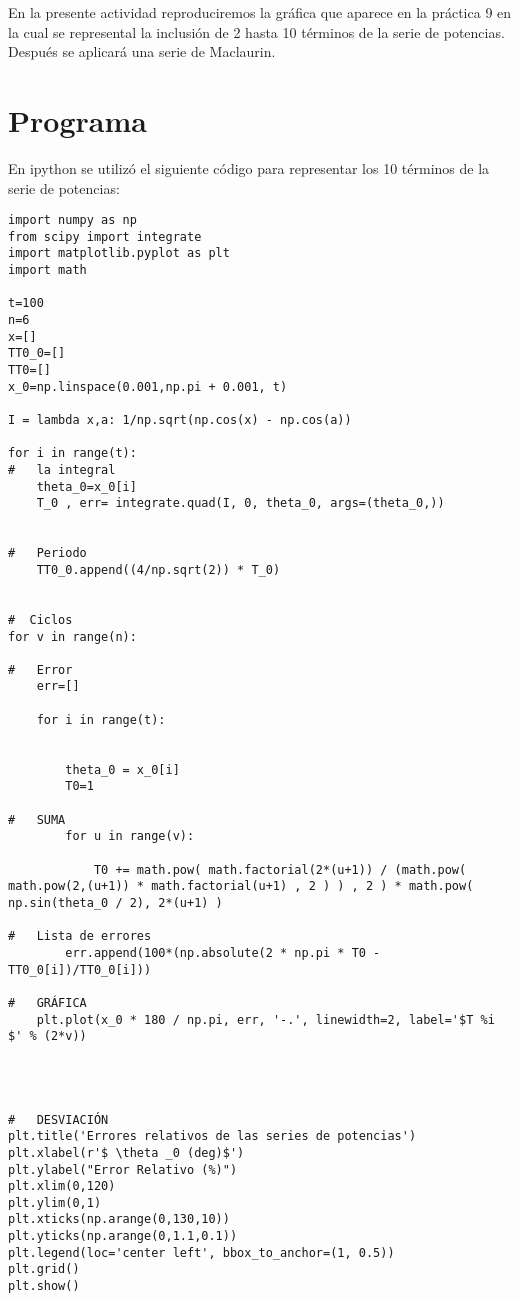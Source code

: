 \documentclass[a4 paper]{article}
\numberwithin{equation}{section}
\newcommand{\0}{\mathbf{0}}
\begin{document}
En la presente actividad reproduciremos la gr\'afica que aparece en la pr\'actica 9 en la cual se represental la inclusi\'on de 2 hasta 10 t\'erminos de la serie de potencias.\\

Despu\'es se aplicar\'a una serie de Maclaurin.

\section{Programa}

En ipython se utilizó el siguiente c\'odigo para representar los 10 t\'erminos de la serie de potencias:

\begin{verbatim}
import numpy as np
from scipy import integrate
import matplotlib.pyplot as plt
import math

t=100
n=6
x=[]
TT0_0=[]
TT0=[]
x_0=np.linspace(0.001,np.pi + 0.001, t)

I = lambda x,a: 1/np.sqrt(np.cos(x) - np.cos(a))

for i in range(t):
#   la integral
    theta_0=x_0[i]
    T_0 , err= integrate.quad(I, 0, theta_0, args=(theta_0,))
    
    
#   Periodo
    TT0_0.append((4/np.sqrt(2)) * T_0)

    
#  Ciclos   
for v in range(n):
    
#   Error   
    err=[]
        
    for i in range(t):
    
    
        theta_0 = x_0[i]
        T0=1

#   SUMA     
        for u in range(v):
            
            T0 += math.pow( math.factorial(2*(u+1)) / (math.pow( math.pow(2,(u+1)) * math.factorial(u+1) , 2 ) ) , 2 ) * math.pow( np.sin(theta_0 / 2), 2*(u+1) )   
            
#   Lista de errores          
        err.append(100*(np.absolute(2 * np.pi * T0 - TT0_0[i])/TT0_0[i]))
   
#   GRÁFICA   
    plt.plot(x_0 * 180 / np.pi, err, '-.', linewidth=2, label='$T %i $' % (2*v))
    
    

   
#   DESVIACIÓN
plt.title('Errores relativos de las series de potencias')
plt.xlabel(r'$ \theta _0 (deg)$')
plt.ylabel("Error Relativo (%)")
plt.xlim(0,120)
plt.ylim(0,1)
plt.xticks(np.arange(0,130,10))
plt.yticks(np.arange(0,1.1,0.1))
plt.legend(loc='center left', bbox_to_anchor=(1, 0.5))
plt.grid()
plt.show()



\end{verbatim}
\end{document}
